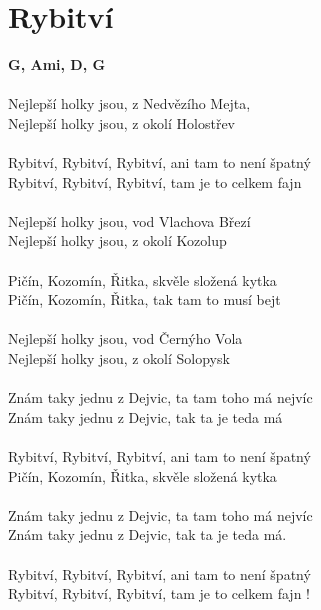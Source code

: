 \section{Rybitví}
\footnotesize\textbf{G, Ami, D, G}\\
\\
\normalsize
Nejlepší holky jsou, z Nedvězího Mejta,\\
Nejlepší holky jsou, z okolí Holostřev\\
\\
Rybitví, Rybitví, Rybitví, ani tam to není špatný\\
Rybitví, Rybitví, Rybitví, tam je to celkem fajn\\
\\
Nejlepší holky jsou, vod Vlachova Březí\\
Nejlepší holky jsou, z okolí Kozolup\\
\\
Pičín, Kozomín, Řitka, skvěle složená kytka\\
Pičín, Kozomín, Řitka, tak tam to musí bejt\\
\\
Nejlepší holky jsou, vod Černýho Vola\\
Nejlepší holky jsou, z okolí Solopysk\\
\\
Znám taky jednu z Dejvic, ta tam toho má nejvíc\\
Znám taky jednu z Dejvic, tak ta je teda má\\
\\
Rybitví, Rybitví, Rybitví, ani tam to není špatný\\
Pičín, Kozomín, Řitka, skvěle složená kytka\\
\\
Znám taky jednu z Dejvic, ta tam toho má nejvíc\\
Znám taky jednu z Dejvic, tak ta je teda má.\\
\\
Rybitví, Rybitví, Rybitví, ani tam to není špatný\\
Rybitví, Rybitví, Rybitví, tam je to celkem fajn !\\